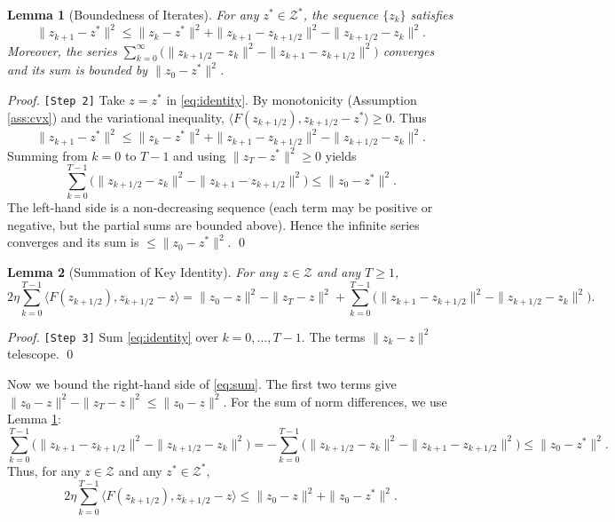 \documentclass{article}
\theoremstyle{plain}
\newtheorem{lemma}{Lemma}
\theoremstyle{definition}
\begin{document}
\begin{lemma}[Boundedness of Iterates] \label{lem:bounded}
For any $z^* \in \mathcal{Z}^*$, the sequence $\{z_k\}$ satisfies
\[
\|z_{k+1} - z^*\|^2 \le \|z_k - z^*\|^2 + \|z_{k+1} - z_{k+1/2}\|^2 - \|z_{k+1/2} - z_k\|^2.
\]
Moreover, the series $\sum_{k=0}^\infty \bigl( \|z_{k+1/2} - z_k\|^2 - \|z_{k+1} - z_{k+1/2}\|^2 \bigr)$ converges and its sum is bounded by $\|z_0 - z^*\|^2$.
\end{lemma}
\begin{proof} \texttt{[Step 2]}
Take $z = z^*$ in \eqref{eq:identity}. By monotonicity (Assumption \ref{ass:cvx}) and the variational inequality, $\langle F(z_{k+1/2}), z_{k+1/2} - z^* \rangle \ge 0$. Thus
\[
\|z_{k+1} - z^*\|^2 \le \|z_k - z^*\|^2 + \|z_{k+1} - z_{k+1/2}\|^2 - \|z_{k+1/2} - z_k\|^2.
\]
Summing from $k=0$ to $T-1$ and using $\|z_T - z^*\|^2 \ge 0$ yields
\[
\sum_{k=0}^{T-1} \bigl( \|z_{k+1/2} - z_k\|^2 - \|z_{k+1} - z_{k+1/2}\|^2 \bigr) \le \|z_0 - z^*\|^2.
\]
The left-hand side is a non-decreasing sequence (each term may be positive or negative, but the partial sums are bounded above). Hence the infinite series converges and its sum is $\le \|z_0 - z^*\|^2$. \qed
\end{proof}

\begin{lemma}[Summation of Key Identity] \label{lem:sum}
For any $z \in \mathcal{Z}$ and any $T \ge 1$,
\begin{equation} \label{eq:sum}
2\eta \sum_{k=0}^{T-1} \langle F(z_{k+1/2}), z_{k+1/2} - z \rangle = \|z_0 - z\|^2 - \|z_T - z\|^2 + \sum_{k=0}^{T-1} \bigl( \|z_{k+1} - z_{k+1/2}\|^2 - \|z_{k+1/2} - z_k\|^2 \bigr).
\end{equation}
\end{lemma}
\begin{proof} \texttt{[Step 3]}
Sum \eqref{eq:identity} over $k=0,\dots,T-1$. The terms $\|z_k - z\|^2$ telescope. \qed
\end{proof}

Now we bound the right-hand side of \eqref{eq:sum}. The first two terms give $\|z_0 - z\|^2 - \|z_T - z\|^2 \le \|z_0 - z\|^2$. For the sum of norm differences, we use Lemma \ref{lem:bounded}:
\[
\sum_{k=0}^{T-1} \bigl( \|z_{k+1} - z_{k+1/2}\|^2 - \|z_{k+1/2} - z_k\|^2 \bigr) = -\sum_{k=0}^{T-1} \bigl( \|z_{k+1/2} - z_k\|^2 - \|z_{k+1} - z_{k+1/2}\|^2 \bigr) \le \|z_0 - z^*\|^2.
\]
Thus, for any $z \in \mathcal{Z}$ and any $z^* \in \mathcal{Z}^*$,
\begin{equation} \label{eq:bound}
2\eta \sum_{k=0}^{T-1} \langle F(z_{k+1/2}), z_{k+1/2} - z \rangle \le \|z_0 - z\|^2 + \|z_0 - z^*\|^2.
\end{equation}
\end{document}
